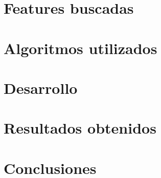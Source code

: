 \documentclass[a4paper]{article}
\begin{document}
\section{Features buscadas}

\section{Algoritmos utilizados}

\section{Desarrollo}

\section{Resultados obtenidos}

\section{Conclusiones}
\end{document}
